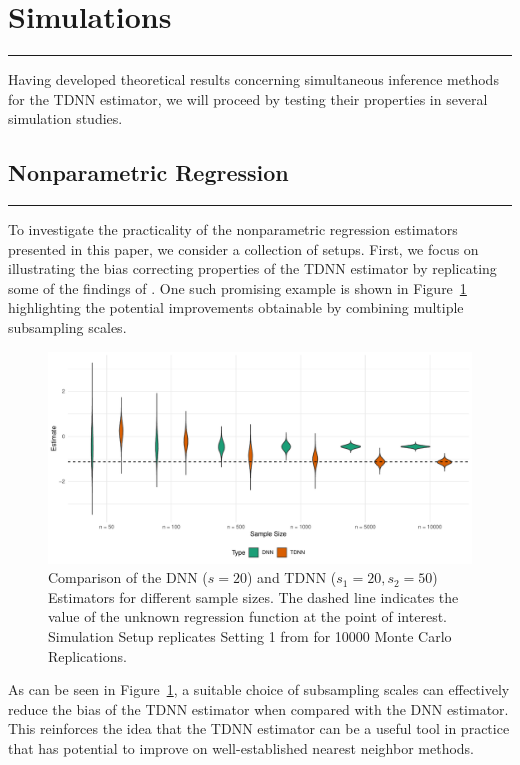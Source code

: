 \section{Simulations}\label{sec:simulations}
\hrule

Having developed theoretical results concerning simultaneous inference methods for the TDNN estimator, we will proceed by testing their properties in several simulation studies.

\subsection{Nonparametric Regression}
\hrule
To investigate the practicality of the nonparametric regression estimators presented in this paper, we consider a collection of setups.
First, we focus on illustrating the bias correcting properties of the TDNN estimator by replicating some of the findings of \citet{demirkaya_optimal_2024}.
One such promising example is shown in Figure~\ref{fig:TDNN_bias_cor} highlighting the potential improvements obtainable by combining multiple subsampling scales.
\begin{figure}[H]
	\centering
	\includegraphics[width = \textwidth]{../Code/Simulations/Graphics/TDNN_DNN.pdf}
	\caption{Comparison of the DNN ($s = 20$) and TDNN ($s_1 = 20, s_2 = 50$) Estimators for different sample sizes.
		The dashed line indicates the value of the unknown regression function at the point of interest.
		Simulation Setup replicates Setting 1 from \citet{demirkaya_optimal_2024} for 10000 Monte Carlo Replications.}
	\label{fig:TDNN_bias_cor}
\end{figure}
As can be seen in Figure~\ref{fig:TDNN_bias_cor}, a suitable choice of subsampling scales can effectively reduce the bias of the TDNN estimator when compared with the DNN estimator.
This reinforces the idea that the TDNN estimator can be a useful tool in practice that has potential to improve on well-established nearest neighbor methods.

